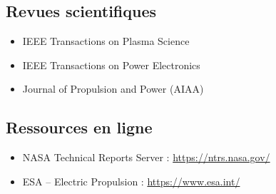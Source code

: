 \documentclass[12pt,a4paper]{article}
\begin{document}
\subsection*{Revues scientifiques}
\begin{itemize}
    \item IEEE Transactions on Plasma Science
    \item IEEE Transactions on Power Electronics
    \item Journal of Propulsion and Power (AIAA)
\end{itemize}

\subsection*{Ressources en ligne}
\begin{itemize}
    \item NASA Technical Reports Server : \url{https://ntrs.nasa.gov/}
    \item ESA -- Electric Propulsion : \url{https://www.esa.int/}
\end{itemize}
\end{document}
